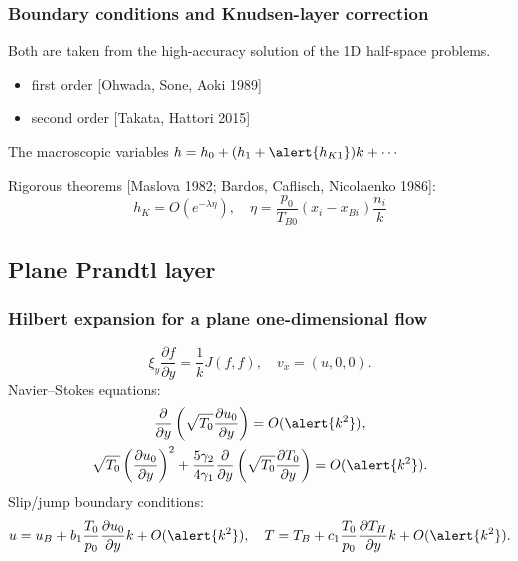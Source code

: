 \documentclass[mathserif]{beamer} %
\newcommand{\pder}[2][]{\frac{\partial#1}{\partial#2}}
\newcommand{\OO}[1]{O(#1)}
\begin{document}
\begin{frame}
    \frametitle{Boundary conditions and Knudsen-layer correction}
    Both are taken from the \alert{high-accuracy} solution of the 1D half-space problems.
    \begin{itemize}
        \item first order [Ohwada, Sone, Aoki 1989]
        \item second order [Takata, Hattori 2015]
    \end{itemize}
    \vspace{10pt}
    \pause

    The macroscopic variables \(h = h_0 + (h_1 + \alert{h_{K1}})k + \cdots\)

    Rigorous theorems [Maslova 1982; Bardos, Caflisch, Nicolaenko 1986]:
    \begin{equation}
        h_K = \OO{e^{-\lambda\eta}}, \quad \eta = \frac{p_0}{T_{B0}}(x_i-x_{Bi})\frac{n_i}k
    \end{equation}
\end{frame}

\subsection{Plane Prandtl layer}

\begin{frame}
    \frametitle{Hilbert expansion for a plane one-dimensional flow}
    \begin{equation}\label{eq:Hilbert_plane_1d}
        \xi_y\pder[f]{y} = \frac1k J(f,f), \quad v_x = (u, 0, 0).
    \end{equation}
    \pause
    Navier--Stokes equations:
    \begin{gather}
        \pder{y}\left( \sqrt{T_0}\pder[u_0]{y} \right) = \OO{\alert{k^2}}, \\
        \sqrt{T_0}\left( \pder[u_0]{y}\right)^2 + \frac{5\gamma_2}
            {4\gamma_1}\pder{y}\left(\sqrt{T_0}\pder[T_0]{y} \right) = \OO{\alert{k^2}}.
    \end{gather}
    Slip/jump boundary conditions:
    \begin{equation}
        u = u_B + b_1\frac{T_0}{p_0} \pder[u_0]{y}k + \OO{\alert{k^2}}, \quad
        T = T_B + c_1\frac{T_0}{p_0}\pder[T_H]{y}k + \OO{\alert{k^2}}.
    \end{equation}
\end{frame}
\end{document}

